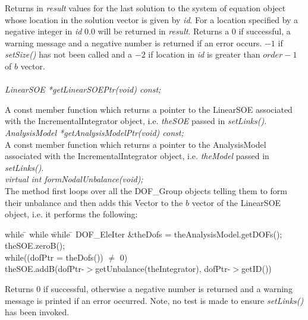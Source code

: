 Returns in {\em result} values for the last solution to the system of
equation object whose location in the solution vector is given by {\em
id}. For a location specified by a negative integer in {\em id} 0.0 will be
returned in {\em result}. Returns a $0$ if successful, a warning
message and a negative number is returned if an error occurs. $-1$ if
{\em setSize()} has not been called and a $-2$ if location in {\em id} is
greater than $order-1$ of $b$ vector.\\

  \\
{\em LinearSOE *getLinearSOEPtr(void) const;} 

A const member function which returns a pointer to the LinearSOE
associated with the IncrementalIntegrator object, i.e. {\em theSOE}
passed in {\em setLinks()}. \\

{\em AnalysisModel *getAnalysisModelPtr(void) const;} \\
A const member function which returns a pointer to the AnalysisModel
associated with the IncrementalIntegrator object, i.e. {\em theModel}
passed in {\em setLinks()}. \\


{\em virtual int formNodalUnbalance(void);} \\
The method first
loops over all the DOF\_Group objects telling them to form their
unbalance and then adds this Vector to the $b$ vector of the LinearSOE
object, i.e. it performs the following: \\
\begin{tabbing}
while \= \+ while \= while \= \kill
DOF\_EleIter \&theDofs = theAnalysisModel.getDOFs();\\
theSOE.zeroB();\\
while((dofPtr = theDofs()) $\neq$ 0) \+ \\
theSOE.addB(dofPtr-$>$getUnbalance(theIntegrator),
dofPtr-$>$getID()) \\
\end{tabbing}
\noindent Returns $0$ if successful, otherwise a  negative number is
returned and a warning message is printed if an error occurred. Note,
no test is made to ensure {\em setLinks()} has been invoked.\\


